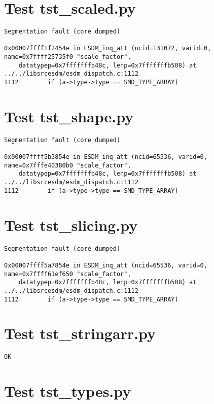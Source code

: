 \section{Test tst\_scaled.py}

\begin{verbatim}
Segmentation fault (core dumped)

0x00007ffff1f2454e in ESDM_inq_att (ncid=131072, varid=0, name=0x7ffff25735f0 "scale_factor",
    datatypep=0x7fffffffb48c, lenp=0x7fffffffb508) at ../../libsrcesdm/esdm_dispatch.c:1112
1112	    if (a->type->type == SMD_TYPE_ARRAY)
\end{verbatim}

\section{Test tst\_shape.py}

\begin{verbatim}
Segmentation fault (core dumped)

0x00007ffff5b3854e in ESDM_inq_att (ncid=65536, varid=0, name=0x7fffe40380b0 "scale_factor",
    datatypep=0x7fffffffb48c, lenp=0x7fffffffb508) at ../../libsrcesdm/esdm_dispatch.c:1112
1112	    if (a->type->type == SMD_TYPE_ARRAY)
\end{verbatim}

\section{Test tst\_slicing.py}

\begin{verbatim}
Segmentation fault (core dumped)

0x00007ffff5a7854e in ESDM_inq_att (ncid=65536, varid=0, name=0x7ffff61ef650 "scale_factor",
    datatypep=0x7fffffffb48c, lenp=0x7fffffffb508) at ../../libsrcesdm/esdm_dispatch.c:1112
1112	    if (a->type->type == SMD_TYPE_ARRAY)
\end{verbatim}

\section{Test tst\_stringarr.py}

\begin{verbatim}
OK
\end{verbatim}

\section{Test tst\_types.py}

